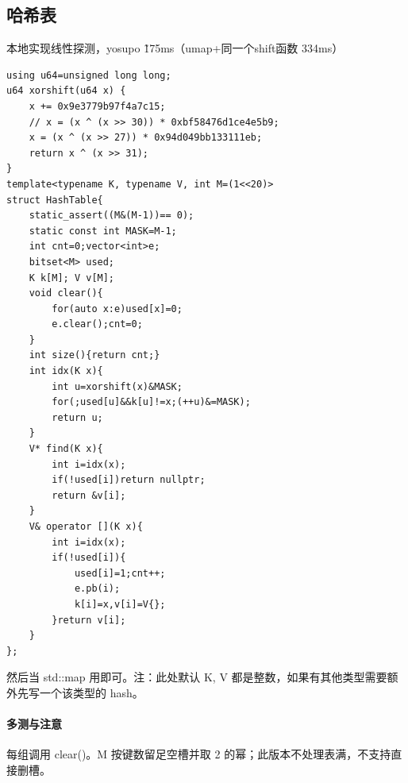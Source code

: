 \subsection{哈希表}
本地实现线性探测，yosupo \~175ms（umap+同一个shift函数 334ms）
\begin{lstlisting}
using u64=unsigned long long;
u64 xorshift(u64 x) {
	x += 0x9e3779b97f4a7c15;
    // x = (x ^ (x >> 30)) * 0xbf58476d1ce4e5b9;
    x = (x ^ (x >> 27)) * 0x94d049bb133111eb;
    return x ^ (x >> 31);
}
template<typename K, typename V, int M=(1<<20)>
struct HashTable{
	static_assert((M&(M-1))== 0);
    static const int MASK=M-1;
	int cnt=0;vector<int>e;
	bitset<M> used;
	K k[M]; V v[M];
	void clear(){
		for(auto x:e)used[x]=0;
		e.clear();cnt=0;
	}
	int size(){return cnt;}
	int idx(K x){
		int u=xorshift(x)&MASK;
		for(;used[u]&&k[u]!=x;(++u)&=MASK);
		return u;
	}
	V* find(K x){
		int i=idx(x);
		if(!used[i])return nullptr;
		return &v[i];
	}
	V& operator [](K x){
		int i=idx(x);
		if(!used[i]){
			used[i]=1;cnt++;
			e.pb(i);
			k[i]=x,v[i]=V{};
		}return v[i];
	}
};
\end{lstlisting}
然后当 std::map 用即可。注：此处默认 K, V 都是整数，如果有其他类型需要额外先写一个该类型的 hash。

\paragraph{多测与注意} 每组调用 clear()。M 按键数留足空槽并取 2 的幂；此版本不处理表满，不支持直接删槽。
